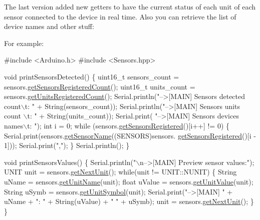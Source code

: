 The last version added new getters to have the current status of each unit of each sensor connected to the device in real time. Also you can retrieve the list of device names and other stuff\+:

For example\+:


\begin{DoxyCode}
\textcolor{preprocessor}{#include <Arduino.h>}
\textcolor{preprocessor}{#include <Sensors.hpp>}

\textcolor{keywordtype}{void} printSensorsDetected() \{
    uint16\_t sensors\_count =  sensors.\hyperlink{classSensors_ad8395e69cf5dcc68d0a8049ec7372a81}{getSensorsRegisteredCount}();
    uint16\_t units\_count   =  sensors.\hyperlink{classSensors_a1d723cdb619b2d61d3e4080182a12cbb}{getUnitsRegisteredCount}();
    Serial.println(\textcolor{stringliteral}{"-->[MAIN] Sensors detected count\(\backslash\)t: "} + String(sensors\_count));
    Serial.println(\textcolor{stringliteral}{"-->[MAIN] Sensors units count  \(\backslash\)t: "}  + String(units\_count));
    Serial.print(  \textcolor{stringliteral}{"-->[MAIN] Sensors devices names\(\backslash\)t: "});
    \textcolor{keywordtype}{int} i = 0;
    \textcolor{keywordflow}{while} (sensors.\hyperlink{classSensors_af9ee8f89e81d76a4c2b41ed6dc38f2f3}{getSensorsRegistered}()[i++] != 0) \{
        Serial.print(sensors.\hyperlink{classSensors_aa7ca70f31838cba52b96f76aa4a0d4a2}{getSensorName}((SENSORS)sensors.
      \hyperlink{classSensors_af9ee8f89e81d76a4c2b41ed6dc38f2f3}{getSensorsRegistered}()[i - 1]));
        Serial.print(\textcolor{stringliteral}{","});
    \}
    Serial.println();
\}

\textcolor{keywordtype}{void} printSensorsValues() \{
    Serial.println(\textcolor{stringliteral}{"\(\backslash\)n-->[MAIN] Preview sensor values:"});
    UNIT unit = sensors.\hyperlink{classSensors_ad33c76f341c86ac1900c5953fca9c0d1}{getNextUnit}();
    \textcolor{keywordflow}{while}(unit != UNIT::NUNIT) \{
        String uName = sensors.\hyperlink{classSensors_a4abb5d2a00d31a407e32cbdabe00b6eb}{getUnitName}(unit);
        \textcolor{keywordtype}{float} uValue = sensors.\hyperlink{classSensors_a7e75dd4e3f2e655a9961f57650cbf749}{getUnitValue}(unit);
        String uSymb = sensors.\hyperlink{classSensors_a365a45dc5c9ab598cfc206368579b94a}{getUnitSymbol}(unit);
        Serial.print(\textcolor{stringliteral}{"-->[MAIN] "} + uName + \textcolor{stringliteral}{": "} + String(uValue) + \textcolor{stringliteral}{" "} + uSymb);
        unit = sensors.\hyperlink{classSensors_ad33c76f341c86ac1900c5953fca9c0d1}{getNextUnit}();
    \}
\}


\end{DoxyCode}
